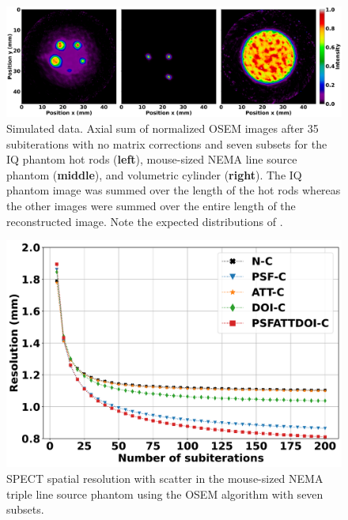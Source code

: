 \documentclass[utf8]{FrontiersinHarvard} %
\begin{document}
\begin{figure}[h!]
\begin{center}
\includegraphics[width=\textwidth]{Figures/OSEM_reconstructions}
\end{center}
\caption{Simulated data. Axial sum of normalized OSEM images after 35 subiterations with no matrix corrections and seven subsets for the IQ phantom hot rods (\textbf{left}), mouse-sized NEMA line source phantom (\textbf{middle}), and volumetric cylinder (\textbf{right}). The IQ phantom image was summed over the length of the hot rods whereas the other images were summed over the entire length of the reconstructed image. Note the expected distributions of .}
\label{fig:reconstructions}
\end{figure}




\begin{figure}[h!]
\begin{center}
\includegraphics[width=0.5\linewidth]{Figures/Resolution.pdf}
\end{center}
\caption{SPECT spatial resolution with scatter in the mouse-sized NEMA triple line source phantom using the OSEM algorithm with seven subsets.}\label{fig:resolution}
\end{figure}
\end{document}
